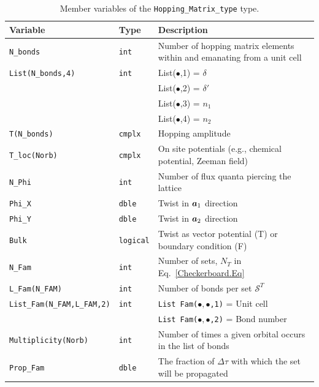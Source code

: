 \begin{table}[h]
	\begin{center}
		\begin{tabular}{@{} p{} @{} p{} p{} @{}}\toprule
			Variable                 & Type            & Description \\\midrule
			\texttt{N\_bonds}        & \texttt{int}    & Number of  hopping  matrix elements within and  emanating from   a unit cell   \\
			\texttt{List(N\_bonds,4)}& \texttt{int}    & List($\bullet$,1) =   $\delta$ \\
			&                 & List($\bullet$,2) =   $\delta'$ \\
			&                 & List($\bullet$,3) =   $n_1$     \\
			&                 & List($\bullet$,4) =   $n_2$     \\ 
			\texttt{T(N\_bonds)}     & \texttt{cmplx}  & Hopping amplitude   \\
			\texttt{T\_loc(Norb)}    & \texttt{cmplx}  & On site  potentials (e.g., chemical potential, Zeeman field)   \\
			\texttt{N\_Phi}          & \texttt{int}    & Number of  flux quanta piercing the lattice   \\
			\texttt{Phi\_X}          & \texttt{dble}   & Twist in $\boldsymbol{a}_1$  direction   \\
			\texttt{Phi\_Y}          & \texttt{dble}   & Twist in $\boldsymbol{a}_2$  direction   \\
			\texttt{Bulk}            & \texttt{logical}& Twist as vector potential (T) or  boundary condition (F)  \\
			\texttt{N\_Fam}          & \texttt{int}    & Number of  sets, $N_T$ in Eq.~\eqref{Checkerboard.Eq}   \\
			\texttt{L\_Fam(N\_FAM)}  & \texttt{int}    & Number of bonds per set $\mathcal{S}^{T}$ \\    
			\texttt{List\_Fam(N\_FAM,L\_FAM,2)}& \texttt{int} & \texttt{List Fam($ \bullet,\bullet $,1)} =  Unit cell \\
			&                        &          \texttt{List Fam($\bullet,\bullet$,2)} =   Bond number \\
			\texttt{Multiplicity(Norb)}& \texttt{int}  & Number of  times a  given orbital  occurs in the list of bonds  \\
			\texttt{Prop\_Fam} & \texttt{dble}         & The fraction of $\Delta \tau$ with which the set will be propagated   \                                
			\\\bottomrule
		\end{tabular}
		\caption{Member variables of the \texttt{Hopping\_Matrix\_type}  type.   
			\label{table:Hopping_matrix}}
	\end{center}
\end{table}

